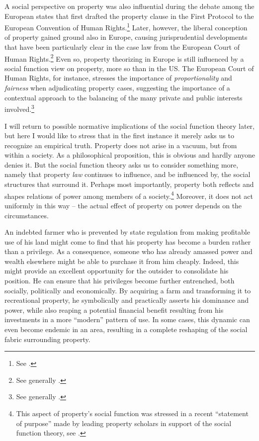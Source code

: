 A social perspective on property was also influential during the debate among the European states that first drafted the property clause in the First Protocol to the European Convention of Human Rights.\footnote{See \cite[1063-1065]{allen10}.} Later, however, the liberal conception of property gained ground also in Europe, causing jurisprudential developments that have been particularly clear in the case law from the European Court of Human Rights.\footnote{See generally \cite{allen10}.} Even so, property theorizing in Europe is still influenced by a social function view on property, more so than in the US. The European Court of Human Rights, for instance, stresses the importance of {\it proportionality} and {\it fairness} when adjudicating property cases, suggesting the importance of a contextual approach to the balancing of the many private and public interests involved.\footnote{See generally \cite[Chapter 5]{allen05}.}

I will return to possible normative implications of the social function theory later, but here I would like to stress that in the first instance it merely asks us to recognize an empirical truth. Property does not arise in a vacuum, but from within a society. As a philosophical proposition, this is obvious and hardly anyone denies it. But the social function theory asks us to consider something more, namely that property {\it law} continues to influence, and be influenced by, the social structures that surround it. Perhaps most importantly, property both reflects and shapes relations of power among members of a society.\footnote{This aspect of property's social function was stressed in a recent ``statement of purpose'' made by leading property scholars in support of the social function theory, see \cite{alexander09a}.} Moreover, it does not act uniformly in this way -- the actual effect of property on power depends on the circumstances.

An indebted farmer who is prevented by state regulation from making profitable use of his land might come to find that his property has become a burden rather than a privilege. As a consequence, someone who has already amassed power and wealth elsewhere might be able to purchase it from him cheaply. Indeed, this might provide an excellent opportunity for the outsider to consolidate his position. He can ensure that his privileges become further entrenched, both socially, politically and economically. By acquiring a farm and transforming it to recreational property, he symbolically and practically asserts his dominance and power, while also reaping a potential financial benefit resulting from his investments in a more ``modern'' pattern of use. In some cases, this dynamic can even become endemic in an area, resulting in a complete reshaping of the social fabric surrounding property.

